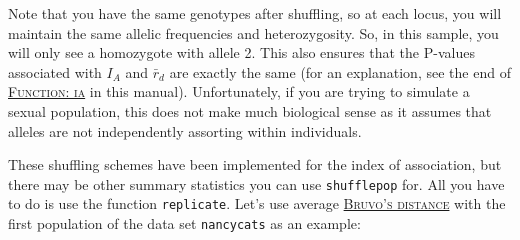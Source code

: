 \documentclass[letterpaper]{article}\usepackage[]{graphicx}\usepackage[]{color}
\newcommand{\seclink}[2]{
  \textsc{\hyperref[#1]{#2}}
}
\begin{document}
\begin{itemize}
\begin{enumerate}
\begin{table}[h!]
\centering
{}
\end{table}

Note that you have the same genotypes after shuffling, so at each locus, you will maintain the same allelic frequencies and heterozygosity. So, in this sample, you will only see a homozygote with allele 2. This also ensures that the P-values associated with $I_A$ and $\bar r_d$ are exactly the same (for an explanation, see the end of\seclink{index:iard:ia}{Function: ia}in this manual). Unfortunately, if you are trying to simulate a sexual population, this does not make much biological sense as it assumes that alleles are not independently assorting within individuals.
  \end{enumerate}
\end{itemize}
These shuffling schemes have been implemented for the index of association, but there may be other summary statistics you can use \texttt{shufflepop} for. All you have to do is use the function \texttt{replicate}. Let's use average\seclink{index:bruvo}{Bruvo's distance}with the first population of the data set \texttt{nancycats} as an example:
\end{document}
